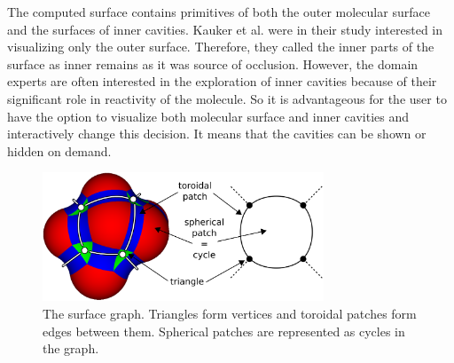 The computed surface contains primitives of both the outer molecular surface and the surfaces of inner cavities.
Kauker et al. \cite{kauker2013rendering} were in their study interested in visualizing only the outer surface.
Therefore, they called the inner parts of the surface as inner remains as it was source of occlusion.
However, the domain experts are often interested in the exploration of inner cavities because of their significant role in reactivity of the molecule.
So it is advantageous for the user to have the option to visualize both molecular surface and inner cavities and interactively change this decision.
It means that the cavities can be shown or hidden on demand.


\begin{figure}[htb]
  \centering
  \includegraphics[width=3.3in]{image/graph.png}
  \caption{The surface graph.
	Triangles form vertices and toroidal patches form edges between them.
	Spherical patches are represented as cycles in the graph.}
	\label{fig:graph}
\end{figure}

